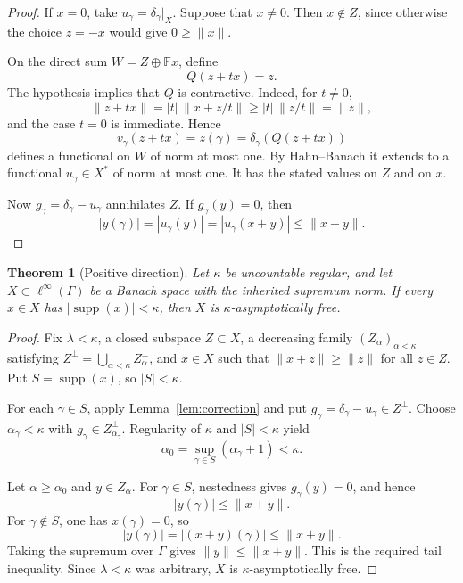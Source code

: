 \documentclass[11pt]{article}
\newtheorem{theorem}{Theorem}
\theoremstyle{remark}
\newcommand{\F}{\mathbb F}
\newcommand{\supp}{\operatorname{supp}}
\begin{document}
\begin{proof}
If \(x=0\), take \(u_\gamma=\delta_\gamma|_X\).  Suppose that
\(x\neq0\).  Then \(x\notin Z\), since otherwise the choice \(z=-x\)
would give \(0\geq\|x\|\).

On the direct sum \(W=Z\oplus\F x\), define
\[
 Q(z+t x)=z.
\]
The hypothesis implies that \(Q\) is contractive.  Indeed, for
\(t\neq0\),
\[
 \|z+t x\|
 =|t|\,\|x+z/t\|
 \geq |t|\,\|z/t\|
 =\|z\|,
\]
and the case \(t=0\) is immediate.  Hence
\[
 v_\gamma(z+t x)=z(\gamma)
 =\delta_\gamma(Q(z+t x))
\]
defines a functional on \(W\) of norm at most one.  By Hahn--Banach it
extends to a functional \(u_\gamma\in X^*\) of norm at most one.  It has
the stated values on \(Z\) and on \(x\).

Now \(g_\gamma=\delta_\gamma-u_\gamma\) annihilates \(Z\).  If
\(g_\gamma(y)=0\), then
\[
 |y(\gamma)|=|u_\gamma(y)|
 =|u_\gamma(x+y)|
 \leq\|x+y\|.
\]
\end{proof}

\begin{theorem}[Positive direction]
\label{thm:positive}
Let \(\kappa\) be uncountable regular, and let
\(X\subset\ell^\infty(\Gamma)\) be a Banach space with the inherited
supremum norm.  If every \(x\in X\) has
\(|\supp(x)|<\kappa\), then \(X\) is \(\kappa\)-asymptotically free.
\end{theorem}

\begin{proof}
Fix \(\lambda<\kappa\), a closed subspace \(Z\subset X\), a decreasing
family \((Z_\alpha)_{\alpha<\kappa}\) satisfying
\(Z^\perp=\bigcup_{\alpha<\kappa}Z_\alpha^\perp\), and \(x\in X\) such
that \(\|x+z\|\geq\|z\|\) for all \(z\in Z\).  Put
\(S=\supp(x)\), so \(|S|<\kappa\).

For each \(\gamma\in S\), apply Lemma~\ref{lem:correction} and put
\(g_\gamma=\delta_\gamma-u_\gamma\in Z^\perp\).  Choose
\(\alpha_\gamma<\kappa\) with
\(g_\gamma\in Z_{\alpha_\gamma}^\perp\).  Regularity of \(\kappa\) and
\(|S|<\kappa\) yield
\[
 \alpha_0=\sup_{\gamma\in S}(\alpha_\gamma+1)<\kappa.
\]

Let \(\alpha\geq\alpha_0\) and \(y\in Z_\alpha\).  For
\(\gamma\in S\), nestedness gives \(g_\gamma(y)=0\), and hence
\[
 |y(\gamma)|\leq\|x+y\|.
\]
For \(\gamma\notin S\), one has \(x(\gamma)=0\), so
\[
 |y(\gamma)|=|(x+y)(\gamma)|\leq\|x+y\|.
\]
Taking the supremum over \(\Gamma\) gives
\(\|y\|\leq\|x+y\|\).  This is the required tail inequality.  Since
\(\lambda<\kappa\) was arbitrary, \(X\) is \(\kappa\)-asymptotically
free.
\end{proof}
\end{document}
